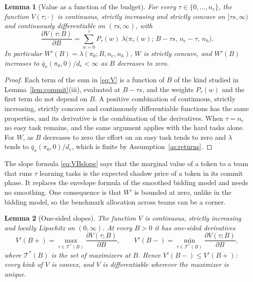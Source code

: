\documentclass[11pt]{article}
\newtheorem{lemma}{Lemma}
\theoremstyle{definition}
\begin{document}
\begin{lemma}[Value as a function of the budget]\label{lem:VB}
For every $\tau\in\{0,\dots,n_e\}$, the function $V(\tau;\cdot)$ is continuous, strictly increasing and strictly concave on $[\tau s,\infty)$ and continuously differentiable on $(\tau s,\infty)$, with
\begin{equation}\label{eq:VBslope}
\frac{\partial V(\tau;B)}{\partial B}=\sum_{w=0}^{\tau}P_\tau(w)\;\lambda\bigl(\pi_\tau(w);\,B-\tau s,\,n_e-\tau,\,n_h\bigr).
\end{equation}
In particular $W'(B)=\lambda(\pi_0;B,n_e,n_h)$, $W$ is strictly concave, and $W'(B)$ increases to $\bar q_x(\pi_0,0)/d_e<\infty$ as $B$ decreases to zero.
\end{lemma}

\begin{proof}
Each term of the sum in \eqref{eq:V} is a function of $B$ of the kind studied in Lemma~\ref{lem:commit}(iii), evaluated at $B-\tau s$, and the weights $P_\tau(w)$ and the first term do not depend on $B$. A positive combination of continuous, strictly increasing, strictly concave and continuously differentiable functions has the same properties, and its derivative is the combination of the derivatives. When $\tau=n_e$ no easy task remains, and the same argument applies with the hard tasks alone. For $W$, as $B$ decreases to zero the effort on an easy task tends to zero and $\lambda$ tends to $\bar q_x(\pi_0,0)/d_e$, which is finite by Assumption~\ref{as:returns}.
\end{proof}

The slope formula \eqref{eq:VBslope} says that the marginal value of a token to a team that runs $\tau$ learning tasks is the expected shadow price of a token in its commit phase. It replaces the envelope formula of the smoothed bidding model and needs no smoothing. One consequence is that $W'$ is bounded at zero, unlike in the bidding model, so the benchmark allocation across teams can be a corner.

\begin{lemma}[One-sided slopes]\label{lem:env}
The function $V$ is continuous, strictly increasing and locally Lipschitz on $(0,\infty)$. At every $B>0$ it has one-sided derivatives
\[
V'(B+)=\max_{\tau\in\mathcal T^*(B)}\frac{\partial V(\tau;B)}{\partial B},
\qquad
V'(B-)=\min_{\tau\in\mathcal T^*(B)}\frac{\partial V(\tau;B)}{\partial B},
\]
where $\mathcal T^*(B)$ is the set of maximizers at $B$. Hence $V'(B-)\le V'(B+)$: every kink of $V$ is convex, and $V$ is differentiable wherever the maximizer is unique.
\end{lemma}
\end{document}
